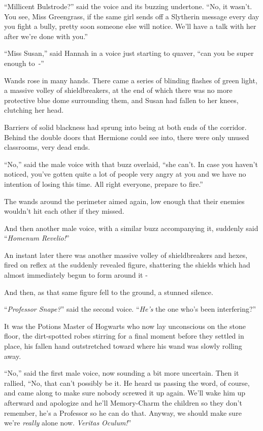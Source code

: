 ``Millicent Bulstrode?'' said the voice and its buzzing undertone. ``No, it wasn't. You see, Miss Greengrass, if the same girl sends off a Slytherin message every day you fight a bully, pretty soon someone else will notice. We'll have a talk with her after we're done with you.''

``Miss Susan,'' said Hannah in a voice just starting to quaver, ``can you be super enough to~-''

Wands rose in many hands. There came a series of blinding flashes of green light, a massive volley of shieldbreakers, at the end of which there was no more protective blue dome surrounding them, and Susan had fallen to her knees, clutching her head.

Barriers of solid blackness had sprung into being at both ends of the corridor. Behind the double doors that Hermione could see into, there were only unused classrooms, very dead ends.

``No,'' said the male voice with that buzz overlaid, ``she can't. In case you haven't noticed, you've gotten quite a lot of people very angry at you and we have no intention of losing this time. All right everyone, prepare to fire.''

The wands around the perimeter aimed again, low enough that their enemies wouldn't hit each other if they missed.

And then another male voice, with a similar buzz accompanying it, suddenly said ``\emph{Homenum Revelio!}''

An instant later there was another massive volley of shieldbreakers and hexes, fired on reflex at the suddenly revealed figure, shattering the shields which had almost immediately begun to form around it -

And then, as that same figure fell to the ground, a stunned silence.

``\emph{Professor Snape?}'' said the second voice. ``\emph{He's} the one who's been interfering?''

It was the Potions Master of Hogwarts who now lay unconscious on the stone floor, the dirt-spotted robes stirring for a final moment before they settled in place, his fallen hand outstretched toward where his wand was slowly rolling away.

``No,'' said the first male voice, now sounding a bit more uncertain. Then it rallied, ``No, that can't possibly be it. He heard us passing the word, of course, and came along to make sure nobody screwed it up again. We'll wake him up afterward and apologize and he'll Memory-Charm the children so they don't remember, he's a Professor so he can do that. Anyway, we should make sure we're \emph{really} alone now. \emph{Veritas Oculum!}''

